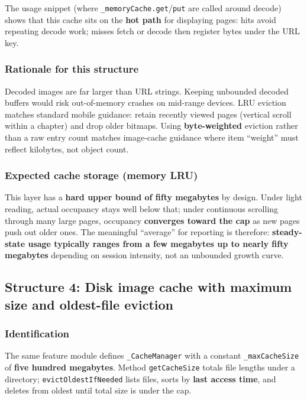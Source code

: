 The usage snippet (where \texttt{\_memoryCache.get}/\texttt{put} are called around decode) shows that this cache sits on the \textbf{hot path} for displaying pages: hits avoid repeating decode work; misses fetch or decode then register bytes under the URL key.

\subsubsection*{Rationale for this structure}
Decoded images are far larger than URL strings. Keeping unbounded decoded buffers would risk out-of-memory crashes on mid-range devices. LRU eviction matches standard mobile guidance: retain recently viewed pages (vertical scroll within a chapter) and drop older bitmaps. Using \textbf{byte-weighted} eviction rather than a raw entry count matches image-cache guidance where item ``weight'' must reflect kilobytes, not object count.

\subsubsection*{Expected cache storage (memory LRU)}
This layer has a \textbf{hard upper bound of fifty megabytes} by design. Under light reading, actual occupancy stays well below that; under continuous scrolling through many large pages, occupancy \textbf{converges toward the cap} as new pages push out older ones. The meaningful ``average'' for reporting is therefore: \textbf{steady-state usage typically ranges from a few megabytes up to nearly fifty megabytes} depending on session intensity, not an unbounded growth curve.


\subsection{Structure 4: Disk image cache with maximum size and oldest-file eviction}

\subsubsection*{Identification}
The same feature module defines \texttt{\_CacheManager} with a constant \texttt{\_maxCacheSize} of \textbf{five hundred megabytes}. Method \texttt{getCacheSize} totals file lengths under a directory; \texttt{evictOldestIfNeeded} lists files, sorts by \textbf{last access time}, and deletes from oldest until total size is under the cap.

